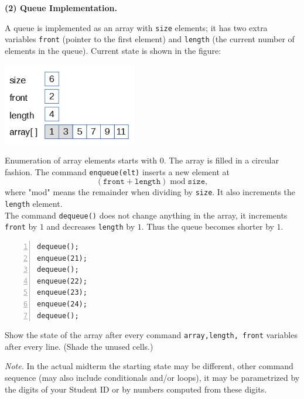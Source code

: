 \documentclass[a4paper,12pt]{article}
\begin{document}
\vspace{20pt}
{\bf \large (2) Queue Implementation.}

A queue is implemented as an array with {\tt size} elements; it has two
extra variables {\tt front} (pointer to the first element) and {\tt length} 
(the current number of elements in the queue). Current state is shown in the figure:

\begin{center}
\includegraphics[width=2.3in]{sample-stacks-queues/queue-structure.png}
\end{center}



Enumeration of array elements starts with $0$. The array is filled in a circular
fashion. The command {\tt enqueue(elt)} inserts a new element at 
$$(\mathtt{front}+\mathtt{length})\;\mbox{mod}\;\mathtt{size},$$
where "mod" means the remainder when dividing by {\tt size}. It also increments the 
{\tt length} element.\\
The command {\tt dequeue()} does not change anything in the array, it increments
{\tt front} by $1$ and decreases {\tt length} by $1$. Thus the queue becomes shorter by $1$. 

\begin{center}
\begin{minipage}{.8\columnwidth}
\begin{Verbatim}[frame=single,numbers=left]
dequeue(); 
enqueue(21);
dequeue(); 
enqueue(22);
enqueue(23);
enqueue(24);
dequeue();
\end{Verbatim}
\end{minipage}
\end{center}

Show the state of the array after every command \textendash{} {\tt array,length, front} 
variables after every line. (Shade the unused cells.)


\vspace{20pt}
{\em Note.} In the actual midterm the starting state may 
be different, other command sequence (may also include conditionals
and/or loops), it may be parametrized by the digits of your Student ID
or by numbers computed from these digits. 
\end{document}
